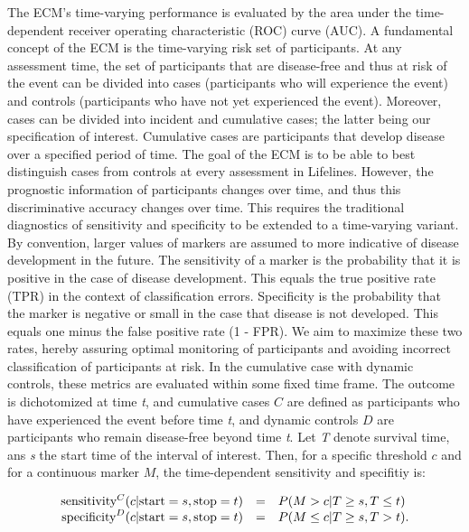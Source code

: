 The ECM's time-varying performance is evaluated by the area under the time-dependent receiver operating characteristic (ROC) curve (AUC). A fundamental concept of the ECM is the time-varying risk set of participants. At any assessment time, the set of participants that are disease-free and thus at risk of the event can be divided into cases (participants who will experience the event) and controls (participants who have not yet experienced the event). Moreover, cases can be divided into incident and cumulative cases; the latter being our specification of interest. Cumulative cases are participants that develop disease over a specified period of time. The goal of the ECM is to be able to best distinguish cases from controls at every assessment in Lifelines. However, the prognostic information of participants changes over time, and thus this discriminative accuracy changes over time. This requires the traditional diagnostics of sensitivity and specificity to be extended to a time-varying variant. By convention, larger values of markers are assumed to more indicative of disease development in the future. The sensitivity of a marker is the probability that it is positive in the case of disease development. This equals the true positive rate (TPR) in the context of classification errors. Specificity is the probability that the marker is negative or small in the case that disease is not developed. This equals one minus the false positive rate (1 - FPR). We aim to maximize these two rates, hereby assuring optimal monitoring of participants and avoiding incorrect classification of participants at risk. In the cumulative case with dynamic controls, these metrics are evaluated within some fixed time frame. The outcome is dichotomized at time \textit{t}, and cumulative cases $C$ are defined as participants who have experienced the event before time \textit{t}, and dynamic controls $D$ are participants who remain disease-free beyond time \textit{t}. Let \textit{T} denote survival time, ans \textit{s} the start time of the interval of interest. Then, for a specific threshold $c$ and for a continuous marker $M$, the time-dependent sensitivity and specifitiy is: 

$$\begin{array}{@{}rcl@{}} \text{sensitivity}^{C}(c|\text{start}=s, \text{stop}=t) &=& P(M > c | T \geq s, T \leq t) \\ \text{specificity}^{D}(c|\text{start}=s, \text{stop}=t) &=& P(M \leq c | T \geq s, T > t). \end{array}$$

